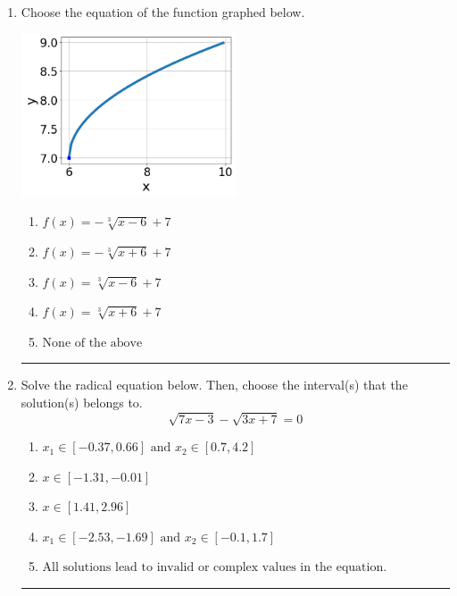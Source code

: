 \documentclass[14pt]{extbook}
\newcommand{\litem}[1]{\item#1\hspace*{-1cm}\rule{\textwidth}{0.4pt}}
\begin{document}
\begin{enumerate}
{\begin{enumerate}[label=\Alph*.]
\end{enumerate} }
\litem{
Choose the equation of the function graphed below.
\begin{center}
    \includegraphics[width=0.5\textwidth]{../Figures/radicalGraphToEquationC.png}
\end{center}
\begin{enumerate}[label=\Alph*.]
\item \( f(x) = - \sqrt[3]{x - 6} + 7 \)
\item \( f(x) = - \sqrt[3]{x + 6} + 7 \)
\item \( f(x) = \sqrt[3]{x - 6} + 7 \)
\item \( f(x) = \sqrt[3]{x + 6} + 7 \)
\item \( \text{None of the above} \)

\end{enumerate} }
\litem{
Solve the radical equation below. Then, choose the interval(s) that the solution(s) belongs to.\[ \sqrt{7 x - 3} - \sqrt{3 x + 7} = 0 \]\begin{enumerate}[label=\Alph*.]
\item \( x_1 \in [-0.37, 0.66] \text{ and } x_2 \in [0.7,4.2] \)
\item \( x \in [-1.31,-0.01] \)
\item \( x \in [1.41,2.96] \)
\item \( x_1 \in [-2.53, -1.69] \text{ and } x_2 \in [-0.1,1.7] \)
\item \( \text{All solutions lead to invalid or complex values in the equation.} \)


\end{enumerate}}
\end{enumerate}
\end{document}

